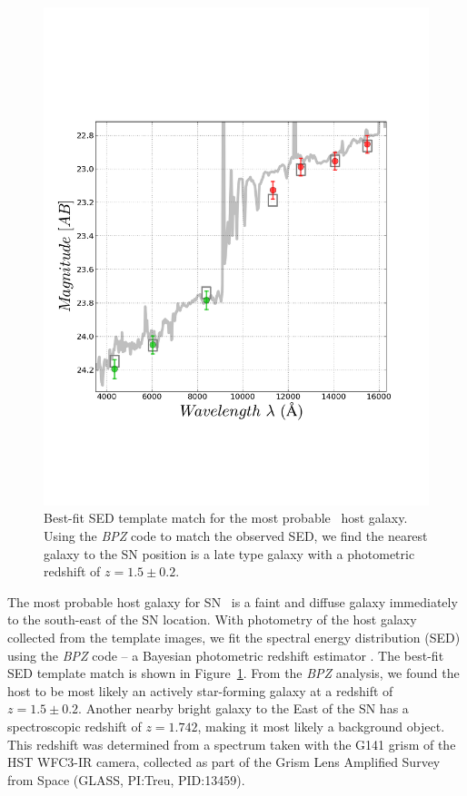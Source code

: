 \begin{figure}
\begin{center}
\includegraphics[width=\columnwidth]{FIG/host_sed_fit}
\caption{  \label{fig:HostSED}
Best-fit SED template match for the most probable \tomas\ host
galaxy. Using the {\it BPZ} code to match the observed SED, we find
the nearest galaxy to the SN position is a late type galaxy with a
photometric redshift of $z=1.5\pm0.2$.}
\end{center}
\end{figure}

The most probable host galaxy for SN \tomas\ is a faint and diffuse
galaxy immediately to the south-east of the SN location.  With
photometry of the host galaxy collected from the template images, we
fit the spectral energy distribution (SED) using the {\it BPZ} code --
a Bayesian photometric redshift estimator \citep{Benitez:2000}. The
best-fit SED template match is shown in Figure~\ref{fig:HostSED}.
From the {\it BPZ} analysis, we found the host to be most likely an
actively star-forming galaxy at a redshift of $z=1.5\pm0.2$.  Another
nearby bright galaxy to the East of the SN has a spectroscopic
redshift of $z=1.742$, making it most likely a background object.
This redshift was determined from a spectrum taken with the G141 grism
of the HST WFC3-IR camera, collected as part of the Grism Lens
Amplified Survey from Space (GLASS, PI:Treu, PID:13459).

